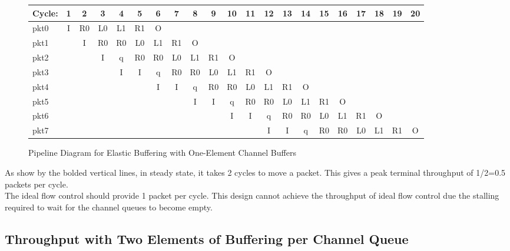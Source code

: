 \documentclass[10pt]{article}
\begin{document}
\begin{figure}[H]
\centering
{\setlength{\tabcolsep}{2pt}
\begin{tabular}{|l|c|c|c|c|c|c|c|c|c!{\vrule width 1.5pt}c|c!{\vrule width 1.5pt}c|c!{\vrule width 1.5pt}c|c!{\vrule width 1.5pt}c|c!{\vrule width 1.5pt}c|c!{\vrule width 1.5pt}c|}
\hline
Cycle: & 1  & 2  & 3  & 4  & 5  & 6  & 7  & 8  & 9  & 10 & 11 & 12 & 13 & 14 & 15 & 16 & 17 & 18 & 19 & 20 \\ \hline
pkt0   & I  & R0 & L0 & L1 & R1 & O  &    &    &    &    &    &    &    &    &    &    &    &    &    &    \\ \hline
pkt1   &    & I  & R0 & R0 & L0 & L1 & R1 & O  &    &    &    &    &    &    &    &    &    &    &    &    \\ \hline
pkt2   &    &    & I  & q  & R0 & R0 & L0 & L1 & R1 & O  &    &    &    &    &    &    &    &    &    &    \\ \hline
pkt3   &    &    &    & I  & I  & q  & R0 & R0 & L0 & L1 & R1 & O  &    &    &    &    &    &    &    &    \\ \hline
pkt4   &    &    &    &    &    & I  & I  & q  & R0 & R0 & L0 & L1 & R1 & O  &    &    &    &    &    &    \\ \hline
pkt5   &    &    &    &    &    &    &    & I  & I  & q  & R0 & R0 & L0 & L1 & R1 & O  &    &    &    &    \\ \hline
pkt6   &    &    &    &    &    &    &    &    &    & I  & I  & q  & R0 & R0 & L0 & L1 & R1 & O  &    &    \\ \hline
pkt7   &    &    &    &    &    &    &    &    &    &    &    & I  & I  & q  & R0 & R0 & L0 & L1 & R1 & O  \\ \hline
\end{tabular}
}
\caption{Pipeline Diagram for Elastic Buffering with One-Element Channel Buffers}
\end{figure}
As show by the bolded vertical lines, in steady state, it takes 2 cycles to move a packet. This gives a peak terminal throughput of 1/2=0.5 packets per cycle.\\
The ideal flow control should provide 1 packet per cycle. This design cannot achieve the throughput of ideal flow control due the stalling required to wait for the channel queues to become empty.

\subsection{Throughput with Two Elements of Buffering per Channel Queue}
\end{document}
